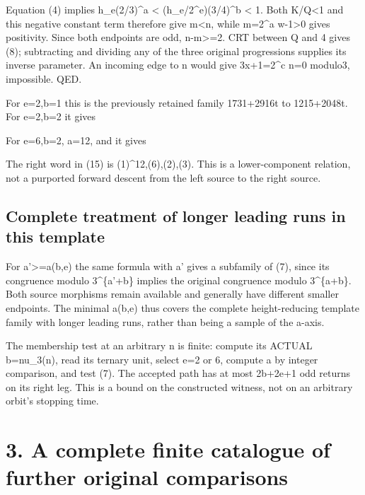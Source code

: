 
Equation (4) implies h\_e(2/3)\^{}a \textless{} (h\_e/2\^{}e)(3/4)\^{}b
\textless{} 1. Both K/Q\textless1 and this negative constant term
therefore give m\textless n, while m=2\^{}a w-1\textgreater0 gives
positivity. Since both endpoints are odd, n-m\textgreater=2. CRT between
Q and 4 gives (8); subtracting and dividing any of the three original
progressions supplies its inverse parameter. An incoming edge to n would
give 3x+1=2\^{}c n=0 modulo3, impossible. QED.

For e=2,b=1 this is the previously retained family 1731+2916t to
1215+2048t. For e=2,b=2 it gives


For e=6,b=2, a=12, and it gives


The right word in (15) is (1)\^{}12,(6),(2),(3). This is a
lower-component relation, not a purported forward descent from the left
source to the right source.

\subsection{Complete treatment of longer leading runs in this template}

For a'\textgreater=a(b,e) the same formula with a' gives a subfamily of
(7), since its congruence modulo 3\^{}\{a'+b\} implies the original
congruence modulo 3\^{}\{a+b\}. Both source morphisms remain available
and generally have different smaller endpoints. The minimal a(b,e) thus
covers the complete height-reducing template family with longer leading
runs, rather than being a sample of the a-axis.

The membership test at an arbitrary n is finite: compute its ACTUAL
b=nu\_3(n), read its ternary unit, select e=2 or 6, compute a by integer
comparison, and test (7). The accepted path has at most 2b+2e+1 odd
returns on its right leg. This is a bound on the constructed witness,
not on an arbitrary orbit's stopping time.

\section{3. A complete finite catalogue of further original comparisons}

